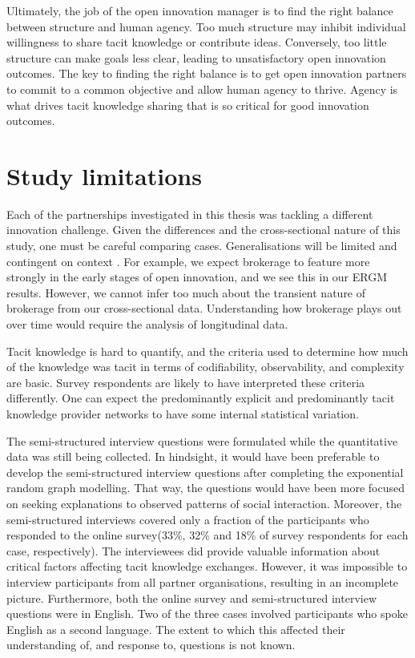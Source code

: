 Ultimately, the job of the open innovation manager is to find the right balance between structure and human agency. Too much structure may inhibit individual willingness to share tacit knowledge or contribute ideas. Conversely, too little structure can make goals less clear, leading to unsatisfactory open innovation outcomes. The key to finding the right balance is to get open innovation partners to commit to a common objective and allow human agency to thrive. Agency is what drives tacit knowledge sharing that is so critical for good innovation outcomes.

 \section{Study limitations}

Each of the partnerships investigated in this thesis was tackling a different innovation challenge. Given the differences and the cross-sectional nature of this study, one must be careful comparing cases. Generalisations will be limited and contingent on context \citep{welch2011theorising}. For example, we expect brokerage to feature more strongly in the early stages of open innovation, and we see this in our ERGM results. However, we cannot infer too much about the transient nature of brokerage from our cross-sectional data. Understanding how brokerage plays out over time would require the analysis of longitudinal data. \medskip

Tacit knowledge is hard to quantify, and the criteria used to determine how much of the knowledge was tacit in terms of codifiability, observability, and complexity are basic. Survey respondents are likely to have interpreted these criteria differently. One can expect the predominantly explicit and predominantly tacit knowledge provider networks to have some internal statistical variation. \medskip

The semi-structured interview questions were formulated while the quantitative data was still being collected. In hindsight, it would have been preferable to develop the semi-structured interview questions after completing the exponential random graph modelling. That way, the questions would have been more focused on seeking explanations to observed patterns of social interaction. Moreover, the semi-structured interviews covered only a fraction of the participants who responded to the online survey(33\%, 32\% and 18\% of survey respondents for each case, respectively). The interviewees did provide valuable information about critical factors affecting tacit knowledge exchanges. However, it was impossible to interview participants from all partner organisations, resulting in an incomplete picture. Furthermore, both the online survey and semi-structured interview questions were in English. Two of the three cases involved participants who spoke English as a second language. The extent to which this affected their understanding of, and response to, questions is not known. \medskip

